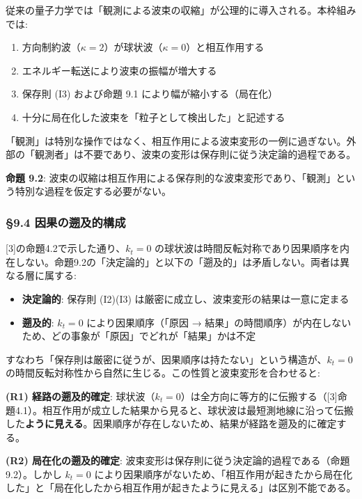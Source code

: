 \documentclass[
  a4paper,11pt]{ltjsarticle}
\providecommand{\tightlist}{%
  \setlength{\itemsep}{0pt}\setlength{\parskip}{0pt}}
\theoremstyle{definition}
\theoremstyle{remark}
\begin{document}
従来の量子力学では「観測による波束の収縮」が公理的に導入される。本枠組みでは:

\begin{enumerate}
\def\labelenumi{\arabic{enumi}.}
\tightlist
\item
  方向制約波（\(\kappa = 2\)）が球状波（\(\kappa = 0\)）と相互作用する
\item
  エネルギー転送により波束の振幅が増大する
\item
  保存則 (I3) および命題 9.1 により幅が縮小する（局在化）
\item
  十分に局在化した波束を「粒子として検出した」と記述する
\end{enumerate}

「観測」は特別な操作ではなく、相互作用による波束変形の一例に過ぎない。外部の「観測者」は不要であり、波束の変形は保存則に従う決定論的過程である。

\textbf{命題 9.2}:
波束の収縮は相互作用による保存則的な波束変形であり、「観測」という特別な過程を仮定する必要がない。

\subsubsection{§9.4
因果の遡及的構成}\label{ux56e0ux679cux306eux9061ux53caux7684ux69cbux6210}

{[}3{]}の命題4.2で示した通り、\(k_t = 0\)
の球状波は時間反転対称であり因果順序を内在しない。命題9.2の「決定論的」と以下の「遡及的」は矛盾しない。両者は異なる層に属する:

\begin{itemize}
\tightlist
\item
  \textbf{決定論的}: 保存則 (I2)(I3)
  は厳密に成立し、波束変形の結果は一意に定まる
\item
  \textbf{遡及的}: \(k_t = 0\) により因果順序（「原因 →
  結果」の時間順序）が内在しないため、どの事象が「原因」でどれが「結果」かは不定
\end{itemize}

すなわち「保存則は厳密に従うが、因果順序は持たない」という構造が、\(k_t = 0\)
の時間反転対称性から自然に生じる。この性質と波束変形を合わせると:

\textbf{(R1) 経路の遡及的確定}:
球状波（\(k_t = 0\)）は全方向に等方的に伝搬する（{[}3{]}命題4.1）。相互作用が成立した結果から見ると、球状波は最短測地線に沿って伝搬した\textbf{ように見える}。因果順序が存在しないため、結果が経路を遡及的に確定する。

\textbf{(R2) 局在化の遡及的確定}:
波束変形は保存則に従う決定論的過程である（命題9.2）。しかし \(k_t = 0\)
により因果順序がないため、「相互作用が起きたから局在化した」と「局在化したから相互作用が起きたように見える」は区別不能である。
\end{document}
